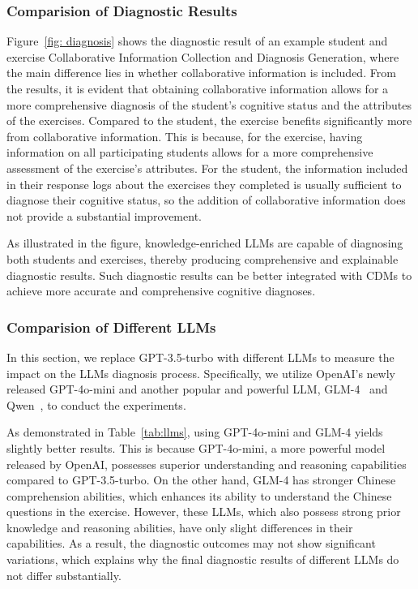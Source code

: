 \subsubsection{Comparision of Diagnostic Results}
Figure~\ref{fig: diagnosis} shows the diagnostic result of an example student and exercise Collaborative Information Collection and Diagnosis Generation, where the main difference lies in whether collaborative information is included.
From the results, it is evident that obtaining collaborative information allows for a more comprehensive diagnosis of the student's cognitive status and the attributes of the exercises.
Compared to the student, the exercise benefits significantly more from collaborative information. This is because, for the exercise, having information on all participating students allows for a more comprehensive assessment of the exercise's attributes. For the student, the information included in their response logs about the exercises they completed is usually sufficient to diagnose their cognitive status, so the addition of collaborative information does not provide a substantial improvement.

As illustrated in the figure, knowledge-enriched LLMs are capable of diagnosing both students and exercises, thereby producing comprehensive and explainable diagnostic results. Such diagnostic results can be better integrated with CDMs to achieve more accurate and comprehensive cognitive diagnoses.

\subsubsection{Comparision of Different LLMs}
\label{sec:app_llm}


In this section, we replace GPT-3.5-turbo with different LLMs to measure the impact on the LLMs diagnosis process.
Specifically, we utilize OpenAI's newly released GPT-4o-mini and another popular and powerful LLM, GLM-4~\cite{glm2024chatglm} and Qwen~\cite{hui2024qwen2}, to conduct the experiments.

As demonstrated in Table~\ref{tab:llms}, using GPT-4o-mini and GLM-4 yields slightly better results. 
This is because GPT-4o-mini, a more powerful model released by OpenAI, possesses superior understanding and reasoning capabilities compared to GPT-3.5-turbo. On the other hand, GLM-4 has stronger Chinese comprehension abilities, which enhances its ability to understand the Chinese questions in the exercise. 
However, these LLMs, which also possess strong prior knowledge and reasoning abilities, have only slight differences in their capabilities. As a result, the diagnostic outcomes may not show significant variations, which explains why the final diagnostic results of different LLMs do not differ substantially.

